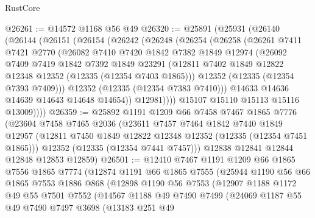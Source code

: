 \begin{lexlean}{RustCore}
\begin{coremodule}
@26261 := @14572 @1168 @56 @49
@26320 := @25891
    (@25931
      (@26140
        (@26144
          (@26151
            (@26154
              (@26242
                (@26248
                  (@26254
                    (@26258
                      (@26261
                        @7411
                        @7421
                        @2770
                        (@26082
                          @7410
                          @7420
                          @1842
                          @7382
                          @1849
                          @12974
                          (@26092
                            @7409
                            @7419
                            @1842
                            @7392
                            @1849
                            @23291
                            (@12811 @7402 @1849 @12822 @12348 @12352 (@12335 (@12354 @7403 @1865)))
                            @12352
                            (@12335 (@12354 @7393 @7409)))
                          @12352
                          (@12335 (@12354 @7383 @7410)))
                        @14633
                        @14636
                        @14639
                        @14643
                        @14648
                        @14654))
                    @12981))))
            @15107
            @15110
            @15113
            @15116
            @13009))))
@26359 := @25892
    @1191
    @1209
    @66
    @7458
    @7467
    @1865
    @7776
    (@23604
      @7458
      @7465
      @2036
      (@23611
        @7457
        @7464
        @1842
        @7440
        @1849
        @12957
        (@12811 @7450 @1849 @12822 @12348 @12352 (@12335 (@12354 @7451 @1865)))
        @12352
        (@12335 (@12354 @7441 @7457)))
      @12838
      @12841
      @12844
      @12848
      @12853
      @12859)
@26501 := @12410
    @7467
    @1191
    @1209
    @66
    @1865
    @7556
    @1865
    @7774
    (@12874
      @1191
      @66
      @1865
      @7555
      (@25944
        @1190
        @56
        @66
        @1865
        @7553
        @1886
        @868
        (@12898
          @1190
          @56
          @7553
          (@12907
            @1188
            @1172
            @49
            @55
            @7501
            @7552
            (@14567
              @1188
              @49
              @7490
              @7499
              (@24069
                @1187
                @55
                @49
                @7490
                @7497
                @3698
                (@13183
                  @251
                  @49

\end{coremodule}
\end{lexlean}
